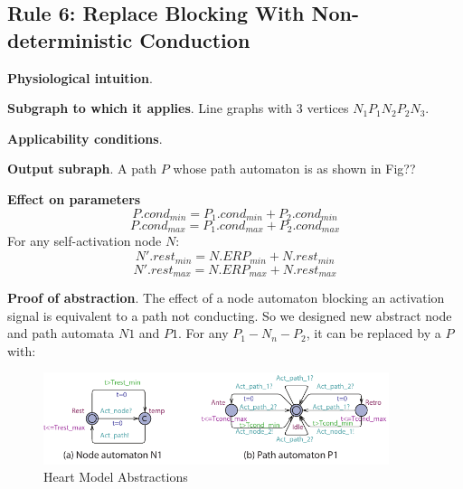 
\subsection{Rule 6: Replace Blocking With Non-deterministic Conduction}
\textbf{Physiological intuition}. 

\textbf{Subgraph to which it applies}.
Line graphs with 3 vertices $N_1 P_1 N_2 P_2 N_3$.

\textbf{Applicability conditions}.

\textbf{Output subraph}.
A path $P$ whose path automaton is as shown in Fig?? 

\textbf{Effect on parameters}
$$P.cond_{min}=P_1.cond_{min}+P_2.cond_{min}$$
$$P.cond_{max}=P_1.cond_{max}+P_2.cond_{max}$$
For any self-activation node $N$:
$$N'.rest_{min}=N.ERP_{min}+N.rest_{min}$$
$$N'.rest_{max}=N.ERP_{max}+N.rest_{max}$$


\textbf{Proof of abstraction}.
The effect of a node automaton blocking an activation signal is equivalent to a path not conducting. So we designed new abstract node and path automata $N1$ and $P1$. For any $P_1-N_n-P_2$, it can be replaced by a $P$ with:

\begin{figure}[!h]
	\centering
	\includegraphics[width=0.9\textwidth]{figs/rule5.pdf}
	\caption{\small Heart Model Abstractions}
	\label{fig:rule5}
\end{figure}

